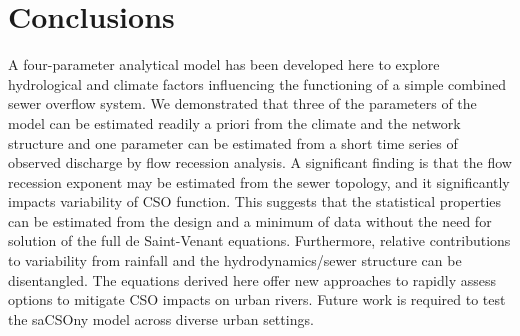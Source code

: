 \documentclass[draft,linenumbers]{agujournal2018}
\begin{document}
\section{Conclusions}
A four-parameter analytical model has been developed here to explore hydrological and climate factors inf\/luencing the functioning of a simple combined sewer overf\/low system. We demonstrated that three of the parameters of the model can be estimated readily a priori from the climate and the network structure and one parameter can be estimated from a short time series of observed discharge by f\/low recession analysis. A signif\/icant f\/inding is that the f\/low recession exponent may be estimated from the sewer topology, and it signif\/icantly impacts variability of CSO function. This suggests that the statistical properties can be estimated from the design and a minimum of data without the need for solution of the full de Saint-Venant equations. Furthermore, relative contributions to variability from rainfall and the hydrodynamics/sewer structure can be disentangled. The equations derived here of\/fer new approaches to  rapidly assess options to mitigate CSO impacts on urban rivers. Future work is required to test the saCSOny model across diverse urban settings.


%
%
%
%
%
%

 


  

 
 
 
 
 
%
 

%
%
\end{document}
